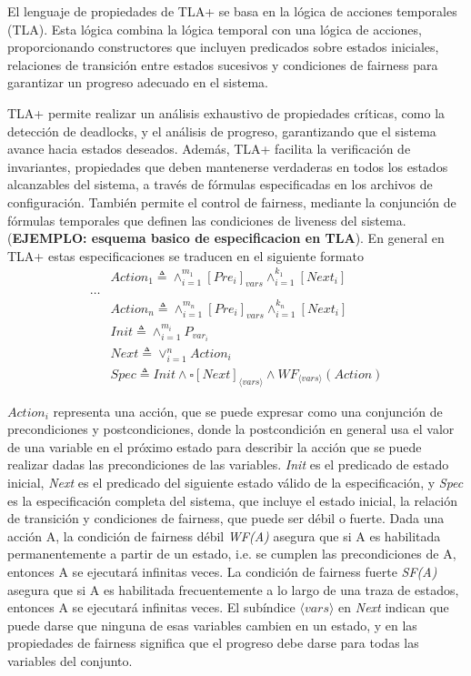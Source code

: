 \documentclass[runningheads]{llncs}
\begin{document}
El lenguaje de propiedades de TLA+ se basa en la lógica de acciones temporales (TLA). Esta lógica combina la lógica temporal con una lógica de acciones, proporcionando constructores que incluyen predicados sobre estados iniciales, relaciones de transición entre estados sucesivos y condiciones de fairness para garantizar un progreso adecuado en el sistema.

TLA+ permite realizar un análisis exhaustivo de propiedades críticas, como la detección de deadlocks, y el análisis de progreso, garantizando que el sistema avance hacia estados deseados. Además, TLA+ facilita la verificación de invariantes, propiedades que deben mantenerse verdaderas en todos los estados alcanzables del sistema, a través de fórmulas especificadas en los archivos de configuración. También permite el control de fairness, mediante la conjunción de fórmulas temporales que definen las condiciones de liveness del sistema. (\textbf{EJEMPLO: esquema basico de especificacion en TLA}). En general en TLA+ estas especificaciones se traducen en el siguiente formato
\[
\begin{aligned}
    & Action_1 \triangleq \land_{i=1}^{m_1} [Pre_i]_{vars} \land_{i=1}^{k_1} [Next_i] \\
    \dots \\
    & Action_n \triangleq \land_{i=1}^{m_n} [Pre_i]_{vars} \land_{i=1}^{k_n} [Next_i] \\
    & Init \triangleq \land_{i=1}^{m_i} P_{var_i} \\
    & Next \triangleq \lor_{i=1}^{n} Action_i \\
    & Spec \triangleq Init \land \square [Next]_{\langle vars \rangle} \land WF_{\langle vars \rangle}(Action)
\end{aligned}
\]

$Action_{i}$ representa una acción, que se puede expresar como una conjunción de precondiciones y postcondiciones, donde la postcondición en general usa el valor de una variable en el próximo estado para describir la acción que se puede realizar dadas las precondiciones de las variables. \textit{Init} es el predicado de estado inicial, \textit{Next} es el predicado del siguiente estado válido de la especificación, y \textit{Spec} es la especificación completa del sistema, que incluye el estado inicial, la relación de transición y condiciones de fairness, que puede ser débil o fuerte. Dada una acción A, la condición de fairness débil \textit{WF(A)} asegura que si A es habilitada permanentemente a partir de un estado, i.e. se cumplen las precondiciones de A, entonces A se ejecutará infinitas veces. La condición de fairness fuerte \textit{SF(A)} asegura que si A es habilitada frecuentemente a lo largo de una traza de estados, entonces A se ejecutará infinitas veces. El subíndice $\langle vars \rangle$ en \textit{Next} indican que puede darse que ninguna de esas variables cambien en un estado, y en las propiedades de fairness significa que el progreso debe darse para todas las variables del conjunto. 
\end{document}

